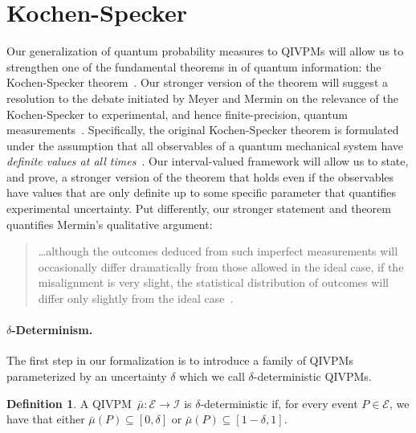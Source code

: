 \documentclass[english,reprint, aps, prl,superscriptaddress, showpacs,
showkeys, longbibliography, amsmath, amssymb]{revtex4-1}
\theoremstyle{plain}
\theoremstyle{definition}
\newtheorem{definition}{Definition}
\newcommand{\events}{\ensuremath{\mathcal{E}}}
\begin{document}
\section{Kochen-Specker} 
\label{sec:Kochen-Specker}
  
Our generalization of quantum probability measures to QIVPMs will
allow us to strengthen one of the fundamental theorems in of quantum
information: the Kochen-Specker
theorem~\cite{PeresRon1988,peres1995quantum}. Our stronger version of
the theorem will suggest a resolution to the debate initiated by Meyer
and Mermin on the relevance of the Kochen-Specker to experimental, and
hence finite-precision, quantum
measurements~\citep{PhysRevLett.83.3751,Mermin1999,Kent1999,HavlicekKrennSummhammerSvozil2001,SimonBruknerZeilinger2001,Cabello2002,Larsson2002,Appleby2002,Peres2003,BarrettKent2004,Appleby_2005,Spekkens2005,GuehneKleinmannCabelloEtAl2010,MazurekPuseyKunjwalEtAl2016}.
Specifically, the original Kochen-Specker theorem is formulated
under the assumption that all observables of a quantum mechanical
system have \emph{definite values at all
  times}~\cite{Held2016}. Our interval-valued framework will allow
us to state, and prove, a stronger version of the theorem that holds
even if the observables have values that are only definite up to some
specific parameter that quantifies experimental uncertainty. Put
differently, our stronger statement and theorem quantifies Mermin's
qualitative argument:
\begin{quote}
  \ldots although the outcomes deduced from such imperfect
  measurements will occasionally differ dramatically from those
  allowed in the ideal case, if the misalignment is very slight, the
  statistical distribution of outcomes will differ only slightly from
  the ideal case~\citep{Mermin1999}.
\end{quote}

\paragraph*{$\delta$-Determinism.} The first step in our formalization
is to introduce a family of QIVPMs parameterized by an uncertainty
$\delta$ which we call $\delta$-deterministic QIVPMs. 

\begin{definition}\label{def:delta-deterministic} A
  QIVPM~$\bar{\mu}:\events\rightarrow\mathscr{I}$ is
  $\delta$-deterministic if, for every event $P\in\events$, we have
  that either 
  $\bar{\mu}\left(P\right)\subseteq\left[0,\delta\right]$ or
  $\bar{\mu}\left(P\right)\subseteq\left[1-\delta,1\right]$. 
\end{definition}
\end{document}
